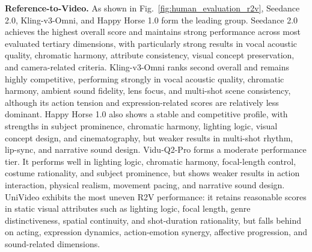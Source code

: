 \documentclass{article}
\begin{document}
\noindent
\textbf{Reference-to-Video.} As shown in Fig.~\ref{fig:human_evaluation_r2v}, Seedance 2.0, Kling-v3-Omni, and Happy Horse 1.0 form the leading group. Seedance 2.0 achieves the highest overall score and maintains strong performance across most evaluated tertiary dimensions, with particularly strong results in vocal acoustic quality, chromatic harmony, attribute consistency, visual concept preservation, and camera-related criteria. Kling-v3-Omni ranks second overall and remains highly competitive, performing strongly in vocal acoustic quality, chromatic harmony, ambient sound fidelity, lens focus, and multi-shot scene consistency, although its action tension and expression-related scores are relatively less dominant. Happy Horse 1.0 also shows a stable and competitive profile, with strengths in subject prominence, chromatic harmony, lighting logic, visual concept design, and cinematography, but weaker results in multi-shot rhythm, lip-sync, and narrative sound design. Vidu-Q2-Pro forms a moderate performance tier. It performs well in lighting logic, chromatic harmony, focal-length control, costume rationality, and subject prominence, but shows weaker results in action interaction, physical realism, movement pacing, and narrative sound design. UniVideo exhibits the most uneven R2V performance: it retains reasonable scores in static visual attributes such as lighting logic, focal length, genre distinctiveness, spatial continuity, and shot-duration rationality, but falls behind on acting, expression dynamics, action-emotion synergy, affective progression, and sound-related dimensions. 





\end{document}
